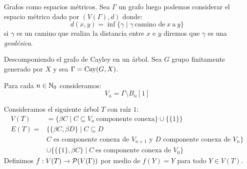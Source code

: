 \documentclass[aspectratio=169, 10pt]{beamer}
\begin{document}
	\begin{frame}[fragile]{Grafos como espacios métricos.}
		Sea $\Gamma$ un grafo luego podemos considerar el espacio métrico dado por $(V(\Gamma), d)$ donde:
		\[
			d(x,y) = \inf \{ \gamma \mid \gamma \ \text{camino de} \ x  \ \text{a} \ y  \}	
		\]
		si $\gamma$ es un camino que realiza la distancia entre $x$ e $y$ diremos que $\gamma$ es una \emph{geodésica}.

	\end{frame}

	\begin{frame}[fragile]{Descomponiendo el grafo de Cayley en un árbol.}
		Sea $G$ grupo finitamente generado por $X$ y sea $\Gamma = \text{Cay}(G, X)$.

		Para cada $n \in \mathbb{N}_{0}$ consideramos:
		\[
			V_{n} = \Gamma \setminus B_{n}[1]	
		\]

		Consideramos el siguiente árbol $T$ con raíz $1$:
		\begin{align*}
			V(T)  & = \{ \beta C \mid C \subseteq V_{n} \ \text{componente conexa} \}  \cup \{ \{1\} \} \\
			E(T)  =  & \{ \{ \beta C, \beta D \}  \mid C \subseteq D \\ 
			& \text{$C$ es componente conexa de $V_{n+1}$ y $D$ componente conexa de $V_{n}$} \} \\
			& \cup \{ \{\{1\}, \beta C\} \mid C \ \text{es componente conexa de $V_{0}$} \}
		\end{align*}
		Definimos $f: V(T) \to {\cal{P}}(V(\Gamma))$ por medio de $f(Y) = Y$ para todo $Y \in V(T)$.
		
		
	\end{frame}
\end{document}
